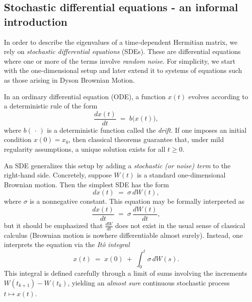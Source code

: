 \documentclass[letterpaper,11pt,oneside,reqno]{article}
\numberwithin{equation}{section}
\theoremstyle{definition}
\begin{document}
\subsection{Stochastic differential equations - an informal introduction}

In order to describe the eigenvalues of a time-dependent Hermitian matrix, we rely on \emph{stochastic differential equations} (SDEs). These are differential equations where one or more of the terms involve \emph{random noise}. For simplicity, we start with the one-dimensional setup and later extend it to systems of equations such as those arising in Dyson Brownian Motion.

In an ordinary differential equation (ODE), a function \(x(t)\) evolves according to a deterministic rule of the form
\[
\frac{dx(t)}{dt} \;=\; b\bigl(x(t)\bigr),
\]
where \(b(\,\cdot\,)\) is a deterministic function called the \emph{drift}. If one imposes an initial condition \(x(0)=x_0\), then classical theorems guarantee that, under mild regularity assumptions, a unique solution exists for all \(t\ge0\).

An SDE generalizes this setup by adding a \emph{stochastic (or noise) term} to the right-hand side. Concretely, suppose \(W(t)\) is a standard one-dimensional Brownian motion. Then the simplest SDE has the form
\[
dx(t) \;=\; \sigma\, dW(t),
\]
where \(\sigma\) is a nonnegative constant. This equation may be formally interpreted as
\[
\frac{dx(t)}{dt} \;=\; \sigma\,\frac{dW(t)}{dt},
\]
but it should be emphasized that \(\tfrac{dW}{dt}\) does not exist in the usual sense of classical calculus (Brownian motion is nowhere differentiable almost surely). Instead, one interprets the equation via the \emph{It\^{o} integral}
\[
x(t) \;=\; x(0)\;+\;\int_0^t \sigma\, dW(s).
\]
This integral is defined carefully through a limit of sums involving the increments \(W(t_{k+1})-W(t_k)\), yielding an \emph{almost sure} continuous stochastic process \(t\mapsto x(t)\).
\end{document}
